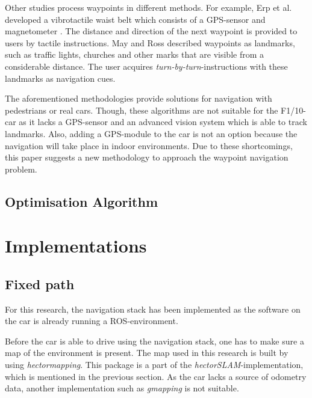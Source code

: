\documentclass[conference,a4paper]{IEEEtran}
\begin{document}
Other studies process waypoints in different methods. For example, Erp et al. developed a vibrotactile waist belt which consists of a GPS-sensor and magnetometer \cite{Erp2005}. The distance and direction of the next waypoint is provided to users by tactile instructions. May and Ross \cite{May2006} described waypoints as landmarks, such as traffic lights, churches and other marks that are visible from a considerable distance. The user acquires \emph{turn-by-turn}-instructions with these landmarks as navigation cues.

The aforementioned methodologies provide solutions for navigation with pedestrians or real cars. Though, these algorithms are not suitable for the F1/10-car as it lacks a GPS-sensor and an advanced vision system which is able to track landmarks. Also, adding a GPS-module to the car is not an option because the navigation will take place in indoor environments. Due to these shortcomings, this paper suggests a new methodology to approach the waypoint navigation problem. 

\subsection{Optimisation Algorithm}

\section{Implementations}
\subsection{Fixed path}
For this research, the navigation stack has been implemented as the software on the car is already running a ROS-environment.

Before the car is able to drive using the navigation stack, one has to make sure a map of the environment is present. The map used in this research is built by using \emph{hector\textunderscore mapping}. This package is a part of the \emph{hector\textunderscore SLAM}-implementation, which is mentioned in the previous section. As the car lacks a source of odometry data, another implementation such as \emph{gmapping} is not suitable.
\end{document}
